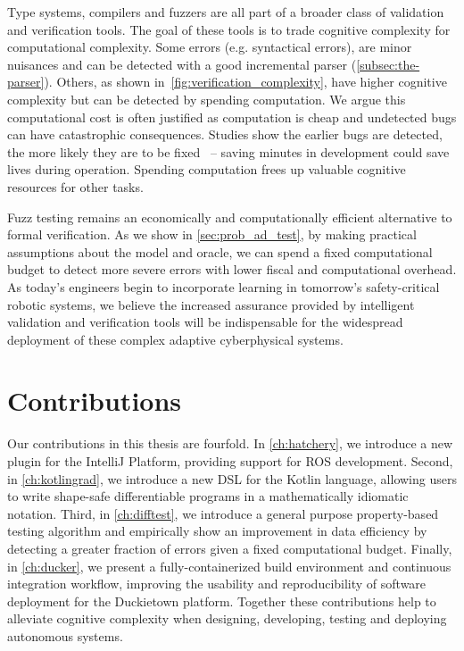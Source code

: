 Type systems, compilers and fuzzers are all part of a broader class of validation and verification tools. The goal of these tools is to trade cognitive complexity for computational complexity. Some errors (e.g. syntactical errors), are minor nuisances and can be detected with a good incremental parser (\autoref{subsec:the-parser}). Others, as shown in~\autoref{fig:verification_complexity}, have higher cognitive complexity but can be detected by spending computation. We argue this computational cost is often justified as computation is cheap and undetected bugs can have catastrophic consequences. Studies show the earlier bugs are detected, the more likely they are to be fixed~\citep{distefano2019scaling} -- saving minutes in development could save lives during operation. Spending computation frees up valuable cognitive resources for other tasks.

Fuzz testing remains an economically and computationally efficient alternative to formal verification. As we show in \autoref{sec:prob_ad_test}, by making practical assumptions about the model and oracle, we can spend a fixed computational budget to detect more severe errors with lower fiscal and computational overhead. As today's engineers begin to incorporate learning in tomorrow's safety-critical robotic systems, we believe the increased assurance provided by intelligent validation and verification tools will be indispensable for the widespread deployment of these complex adaptive cyberphysical systems.

\section{Contributions}

Our contributions in this thesis are fourfold. In \autoref{ch:hatchery}, we introduce a new plugin for the IntelliJ Platform, providing support for ROS development. Second, in \autoref{ch:kotlingrad}, we introduce a new DSL for the Kotlin language, allowing users to write shape-safe differentiable programs in a mathematically idiomatic notation. Third, in \autoref{ch:difftest}, we introduce a general purpose property-based testing algorithm and empirically show an improvement in data efficiency by detecting a greater fraction of errors given a fixed computational budget. Finally, in \autoref{ch:ducker}, we present a fully-containerized build environment and continuous integration workflow, improving the usability and reproducibility of software deployment for the Duckietown platform. Together these contributions help to alleviate cognitive complexity when designing, developing, testing and deploying autonomous systems.